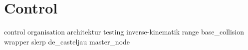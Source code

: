\graphicspath{{sections/control/images/}}

\section{Control}
{control}
{organisation}
{architektur}
{testing}
{inverse-kinematik}
{range}
{base_collision}
{wrapper}
{slerp}
{de_casteljau}
{master_node}